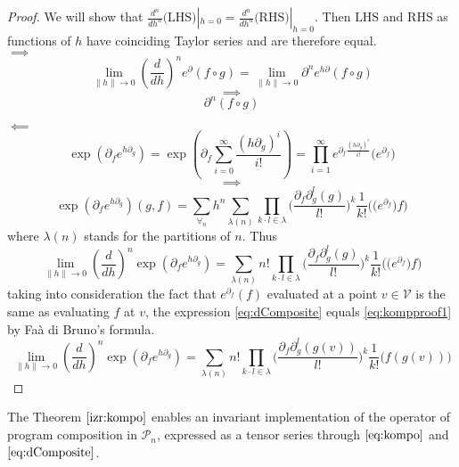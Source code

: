 \documentclass[smallcondensed]{svjour3}
\newcommand{\VV}{\mathcal{V}}
\newcommand{\dP}{\mathcal{P}}
\newcommand{\D}{\partial}
\begin{document}
\begin{proof}
  We will show that $\frac{d^n}{dh^n}\text{(LHS)}|_{h=0}=\frac{d^n}{dh^n}\text{(RHS)}|_{h=0}$. Then $\text{LHS}$ and $\text{RHS}$ as functions
  of $h$ have coinciding Taylor series and are therefore equal.\\
 $\implies$
 $$\lim\limits_{\lVert h\rVert\to 0}(\frac{d}{dh})^ne^\D(f\circ g)=\lim\limits_{\lVert h\rVert\to 0}\D^ne^{h\D}(f\circ g)$$
 $$\implies$$
 \begin{equation}\label{eq:kompproof1}
 \D^n(f\circ g)
 \end{equation}
 
 $\impliedby$
 $$\exp(\D_fe^{h\D_g})=\exp\left(\D_f\sum\limits_{i=0}^{\infty}\frac{(h\D_g)^i}{i!}\right)=\prod_{i=1}^{\infty}e^{\D_f\frac{(h\D_g)^i}{i!}}\Big(e^{\D_f}\Big)$$
 $$\implies$$
 $$\exp(\D_fe^{h\D_g})(g,f)=\sum\limits_{\forall_n}h^n\sum\limits_{\lambda(n)}\prod\limits_{k\cdot l\in\lambda}\Big(\frac{\D_f\D_g^l(g)}{l!}\Big)^k\frac{1}{k!}\Big(\Big(e^{\D_f}\Big)f\Big)$$
 where $\lambda(n)$ stands for the partitions of $n$. Thus
 \begin{equation}\label{eq:dComposite}
 \lim\limits_{\lVert h\rVert\to 0}(\frac{d}{dh})^n\exp(\D_fe^{h\D_g})=\sum\limits_{\lambda(n)}n!\prod\limits_{k\cdot l\in\lambda}\Big(\frac{\D_f\D_g^l(g)}{l!}\Big)^k\frac{1}{k!}\Big(\Big(e^{\D_f}\Big)f\Big)
 \end{equation}
 taking into consideration the fact that $e^{\D_f}(f)$ evaluated at a point $v\in \VV$ is the same as evaluating $f$ at $v$, the expression \eqref{eq:dComposite} equals \eqref{eq:kompproof1} by Faà di Bruno's formula.
   \begin{equation}\label{eq:dCompositePoint}
   \lim\limits_{\lVert h\rVert\to 0}(\frac{d}{dh})^n\exp(\D_fe^{h\D_g})=\sum\limits_{\lambda(n)}n!\prod\limits_{k\cdot l\in\lambda}\Big(\frac{\D_f\D_g^l(g(v))}{l!}\Big)^k\frac{1}{k!}\Big(f(g(v))\Big)
   \end{equation}
 \end{proof}       
 The Theorem $\ref{izr:kompo}$ enables an invariant implementation of the operator of program composition in $\dP_n$, expressed as a tensor series through $\eqref{eq:kompo}$ and $\eqref{eq:dComposite}$. 
 
\end{document}
